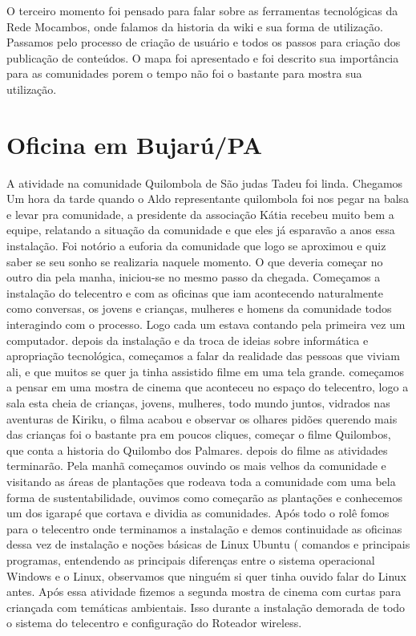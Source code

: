 \documentclass[a4paper, 11pt, oneside]{Relatorio_sem}  %
\begin{document}
O terceiro momento foi pensado para falar sobre as ferramentas
tecnológicas da Rede Mocambos, onde falamos da historia da wiki e sua
forma de utilização. Passamos pelo processo de criação de usuário e
todos os passos para criação dos publicação de conteúdos. O mapa foi
apresentado e foi descrito sua importância para as comunidades porem o
tempo não foi o bastante para mostra sua utilização.

\section{Oficina em Bujarú/PA}
A atividade na comunidade Quilombola de São judas Tadeu foi
linda. Chegamos Um hora da tarde quando o Aldo representante
quilombola foi nos pegar na balsa e levar pra comunidade, a presidente
da associação Kátia recebeu muito bem a equipe, relatando a situação
da comunidade e que eles já esparavão a anos essa instalação. Foi
notório a euforia da comunidade que logo se aproximou e quiz saber se
seu sonho se realizaria naquele momento. O que deveria começar no
outro dia pela manha, iniciou-se no mesmo passo da chegada. Começamos
a instalação do telecentro e com as oficinas que iam acontecendo
naturalmente como conversas, os jovens e crianças, mulheres e homens
da comunidade todos interagindo com o processo. Logo cada um estava
contando pela primeira vez um computador. depois da instalação e da
troca de ideias sobre informática e apropriação tecnológica, começamos
a falar da realidade das pessoas que viviam ali, e que muitos se quer
ja tinha assistido filme em uma tela grande. começamos a pensar em uma
mostra de cinema que aconteceu no espaço do telecentro, logo a sala
esta cheia de crianças, jovens, mulheres, todo mundo juntos, vidrados
nas aventuras de Kiriku, o filma acabou e observar os olhares pidões
querendo mais das crianças foi o bastante pra em poucos cliques,
começar o filme Quilombos, que conta a historia do Quilombo dos
Palmares. depois do filme as atividades terminarão. Pela manhã
começamos ouvindo os mais velhos da comunidade e visitando as áreas de
plantações que rodeava toda a comunidade com uma bela forma de
sustentabilidade, ouvimos como começarão as plantações e conhecemos um
dos igarapé que cortava e dividia as comunidades. Após todo o rolê
fomos para o telecentro onde terminamos a instalação e demos
continuidade as oficinas dessa vez de instalação e noções básicas de
Linux Ubuntu ( comandos e principais programas, entendendo as
principais diferenças entre o sistema operacional Windows e o Linux,
observamos que ninguém si quer tinha ouvido falar do Linux antes. Após
essa atividade fizemos a segunda mostra de cinema com curtas para
criançada com temáticas ambientais. Isso durante a instalação demorada
de todo o sistema do telecentro e configuração do Roteador wireless.
\end{document}
